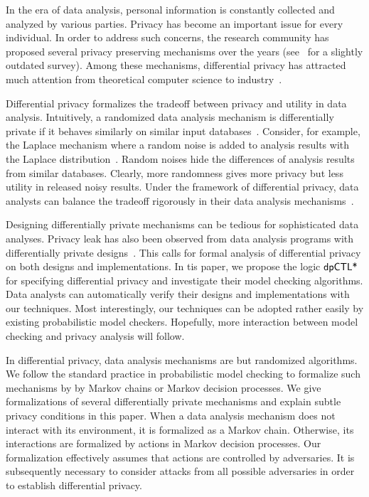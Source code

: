 

In the era of data analysis, personal information is constantly
collected and analyzed by various parties. Privacy has become an
important issue for every individual. In order to address such
concerns, the research community has proposed several privacy
preserving mechanisms over the years (see~\cite{FWC:10:PPDP} for a
slightly outdated survey). Among these mechanisms, differential
privacy has attracted much attention from theoretical computer science
to industry~\cite{DR:14:AFDP,JLE:14:DPML,A:16:EPYU}.

Differential privacy formalizes the tradeoff between privacy and
utility in data analysis. Intuitively, a randomized data analysis
mechanism is differentially private if it behaves similarly on similar
input databases~\cite{DMNS:06:CNSPD,D:06:DP}. Consider, for example,
the Laplace mechanism where a random noise is added to analysis
results with the Laplace distribution~\cite{DR:14:AFDP}. Random noises
hide the differences of analysis results from similar databases.
Clearly, more
randomness gives more privacy but less utility in released noisy
results. Under the framework of differential privacy, data analysts
can balance the tradeoff rigorously in their data analysis
mechanisms~\cite{DR:14:AFDP,JLE:14:DPML}.


Designing differentially private mechanisms can be tedious for
sophisticated data analyses. Privacy leak has also been observed from
data analysis programs with differentially private
designs~\cite{M:12:SLSBDP,TKBW:17:PLAI}. This calls for formal
analysis of differential privacy on both designs and implementations.
In tis paper, we propose the logic $\textsf{dpCTL*}$ for specifying
differential privacy and investigate their model checking
algorithms. Data analysts can automatically verify their designs and
implementations with our techniques. Most interestingly, our
techniques can be adopted rather easily by existing probabilistic
model checkers. Hopefully, more interaction between model checking and
privacy analysis will follow.


In differential privacy, data analysis mechanisms are
but randomized algorithms. We follow the standard practice in
probabilistic model checking to formalize such mechanisms by
by Markov chains or Markov decision processes. We give
formalizations of several differentially private mechanisms and
explain subtle privacy conditions in this paper.
When a data analysis mechanism does not
interact with its environment, it is formalized as a Markov
chain. Otherwise, its interactions are formalized by actions in
Markov decision processes. Our formalization effectively assumes that
actions are controlled by adversaries. It is subsequently necessary to
consider attacks from all possible adversaries in order to establish
differential privacy.

